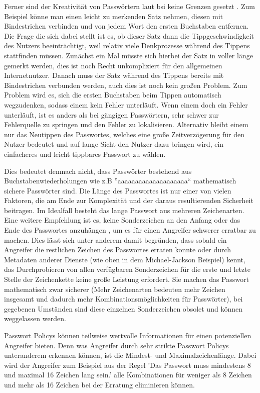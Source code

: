 Ferner sind der Kreativität von Passwörtern laut \ac{bsi} keine Grenzen gesetzt \cite{A4}. Zum Beispiel könne man einen leicht zu merkenden Satz nehmen, diesen mit Bindestrichen verbinden und von jedem Wort den ersten Buchstaben entfernen. Die Frage die sich dabei stellt ist es, ob dieser Satz dann die Tippgeschwindigkeit des Nutzers beeinträchtigt, weil relativ viele Denkprozesse während des Tippens stattfinden müssen. Zunächst ein Mal müsste sich hierbei der Satz in voller länge gemerkt werden, dies ist noch Recht unkompliziert für den allgemeinen Internetnutzer. Danach muss der Satz während des Tippens bereits mit Bindestrichen verbunden werden, auch dies ist noch kein großen Problem. Zum Problem wird es, sich die ersten Buchstaben beim Tippen automatisch wegzudenken, sodass einem kein Fehler unterläuft. Wenn einem doch ein Fehler unterläuft, ist es anders als bei gängigen Passwörtern, sehr schwer zur Fehlerquelle zu springen und den Fehler zu lokalisieren. Alternativ bleibt einem nur das Neutippen des Passwortes, welches eine große Zeitverzögerung für den Nutzer bedeutet und auf lange Sicht den Nutzer dazu bringen wird, ein einfacheres und leicht tippbares Passwort zu wählen.

Dies bedeutet demnach nicht, dass Passwörter bestehend aus Buchstabenwiederholungen wie z.B ''aaaaaaaaaaaaaaaaaaaa`` mathematisch sichere Passwörter sind. Die Länge des Passwortes ist nur einer von vielen Faktoren, die am Ende zur Komplexität und der daraus resultierenden Sicherheit beitragen. Im Idealfall besteht das lange Passwort aus mehreren Zeichenarten. Eine weitere Empfehlung ist es, keine Sonderzeichen an den Anfang oder das Ende des Passwortes anzuhängen \cite{A4}, um es für einen Angreifer schwerer erratbar zu machen. Dies lässt sich unter anderem damit begründen, dass sobald ein Angreifer die restlichen Zeichen des Passwortes erraten konnte oder durch Metadaten anderer Dienste (wie oben in dem Michael-Jackson Beispiel) kennt, das Durchprobieren von allen verfügbaren Sonderzeichen für die erste und letzte Stelle der Zeichenkette keine große Leistung erfordert. Sie machen das Passwort mathematisch zwar sicherer (Mehr Zeichenarten bedeuten mehr Zeichen insgesamt und dadurch mehr Kombinationsmöglichkeiten für Passwörter), bei gegebenen Umständen sind diese einzelnen Sonderzeichen obsolet und können weggelassen werden.

Passwort Policys können teilweise wertvolle Informationen für einen potenziellen Angreifer bieten. Denn was Angreifer durch sehr strikte Passwort Policys unteranderem erkennen können, ist die Mindest- und Maximalzeichenlänge. Dabei wird der Angreifer zum Beispiel aus der Regel 'Das Passwort muss mindestens 8 und maximal 16 Zeichen lang sein.' alle Kombinationen für weniger als 8 Zeichen und mehr als 16 Zeichen bei der Erratung eliminieren können.
\newpage

